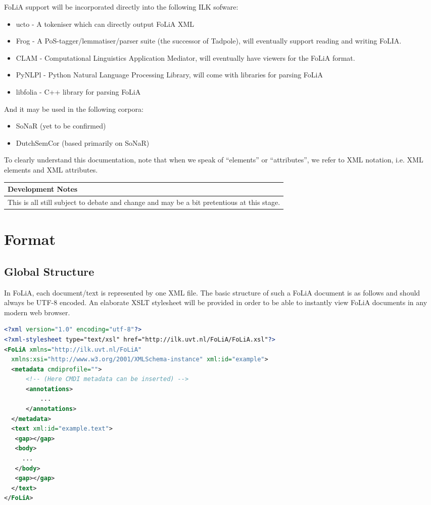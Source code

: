 \documentclass[a4paper,12pt]{report}
\newenvironment{devnotes}
{
\begin{center}
    \begin{tabular}[h!]{|p{0.8\textwidth}|}
    \hline
    {\bf Development Notes}\\\hline}
{   \\\hline
    \end{tabular}
\end{center}}
\begin{document}
FoLiA support will be incorporated directly into the following ILK sofware:

\begin{itemize} 
\item ucto - A tokeniser which can directly output FoLiA XML 
\item Frog - A PoS-tagger/lemmatiser/parser suite (the successor of Tadpole), will eventually support reading and writing FoLIA.
\item CLAM - Computational Linguistics Application Mediator, will eventually have viewers for the FoLiA format.
\item PyNLPl - Python Natural Language Processing Library, will come with libraries for parsing FoLiA
\item libfolia - C++ library for parsing FoLiA
\end{itemize}

And it may be used in the following corpora:

\begin{itemize} 
\item SoNaR (yet to be confirmed)
\item DutchSemCor (based primarily on SoNaR)
\end{itemize}

To clearly understand this documentation, note that when we speak of ``elements'' or ``attributes'', we refer to XML notation, i.e. XML elements and XML attributes.

\begin{devnotes}
This is all still subject to debate and change and may be a bit pretentious at this stage.
\end{devnotes}

\chapter{Format}

\section{Global Structure}

In FoLiA, each document/text is represented by one XML file. The basic structure of such a FoLiA document is as follows and should always be UTF-8 encoded. An elaborate XSLT stylesheet will be provided in order to be able to instantly view FoLiA documents in any modern web browser.

\begin{lstlisting}[language=xml]
<?xml version="1.0" encoding="utf-8"?>
<?xml-stylesheet type="text/xsl" href="http://ilk.uvt.nl/FoLiA/FoLiA.xsl"?>
<FoLiA xmlns="http://ilk.uvt.nl/FoLiA"
  xmlns:xsi="http://www.w3.org/2001/XMLSchema-instance" xml:id="example">
  <metadata cmdiprofile="">
      <!-- (Here CMDI metadata can be inserted) -->
      <annotations>
          ...
      </annotations>    
  </metadata>
  <text xml:id="example.text">
   <gap></gap>
   <body>
     ...
   </body>
   <gap></gap>
  </text>
</FoLiA>  
\end{lstlisting}
\end{document}

